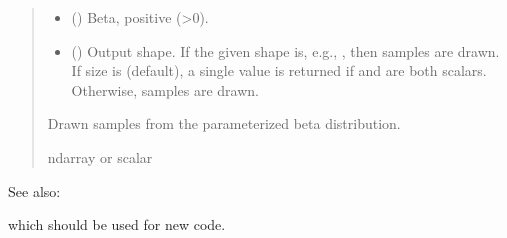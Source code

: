 \documentclass[letterpaper,10pt,english]{sphinxmanual}
\begin{document}
\begin{fulllineitems}
\begin{quote}
\begin{description}
\begin{itemize}
\item {} 
\sphinxAtStartPar
{} () \textendash{} Beta, positive (\textgreater{}0).

\item {} 
\sphinxAtStartPar
{} (\sphinxstyleliteralemphasis{\sphinxupquote{, }}) \textendash{} Output shape.  If the given shape is, e.g., , then
 samples are drawn.  If size is  (default),
a single value is returned if  and  are both scalars.
Otherwise,  samples are drawn.

\end{itemize}

\sphinxAtStartPar
{} \textendash{} Drawn samples from the parameterized beta distribution.

\sphinxAtStartPar
ndarray or scalar

\end{description}\end{quote}


\begin{sphinxseealso}{See also:}
\begin{description}
\sphinxAtStartPar
which should be used for new code.

\end{description}


\end{sphinxseealso}


\end{fulllineitems}

\end{document}
